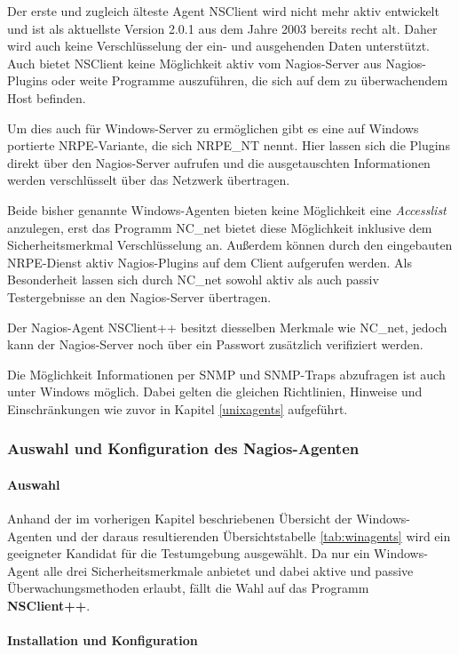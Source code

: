 Der erste und zugleich älteste Agent NSClient wird nicht mehr aktiv entwickelt und ist als aktuellste Version 2.0.1 aus dem Jahre 2003 bereits recht alt.
Daher wird auch keine Verschlüsselung der ein- und ausgehenden Daten unterstützt.
Auch bietet NSClient keine Möglichkeit aktiv vom Nagios-Server aus Nagios-Plugins oder weite Programme auszuführen, die sich auf dem zu überwachendem Host befinden.

Um dies auch für Windows-Server zu ermöglichen gibt es eine auf Windows portierte \gls{NRPE}-Variante, die sich NRPE\_NT nennt.
Hier lassen sich die Plugins direkt über den Nagios-Server aufrufen und die ausgetauschten Informationen werden verschlüsselt über das Netzwerk übertragen.

Beide bisher genannte Windows-Agenten bieten keine Möglichkeit eine \textit{Accesslist} anzulegen, erst das Programm NC\_net bietet diese Möglichkeit inklusive dem Sicherheitsmerkmal Verschlüsselung an.
Außerdem können durch den eingebauten \gls{NRPE}-Dienst aktiv Nagios-Plugins auf dem Client aufgerufen werden.
Als Besonderheit lassen sich durch NC\_net sowohl aktiv als auch passiv Testergebnisse an den Nagios-Server übertragen. 

Der Nagios-Agent NSClient++ besitzt diesselben Merkmale wie NC\_net, jedoch kann der Nagios-Server noch über ein Passwort zusätzlich verifiziert werden.

Die Möglichkeit Informationen per \gls{SNMP} und \gls{SNMP}-Traps abzufragen ist auch unter Windows möglich.
Dabei gelten die gleichen Richtlinien, Hinweise und Einschränkungen wie zuvor in Kapitel \ref{unixagents} aufgeführt.

\subsubsection{Auswahl und Konfiguration des Nagios-Agenten}

\paragraph{Auswahl}
Anhand der im vorherigen Kapitel beschriebenen Übersicht der Windows-Agenten und der daraus resultierenden Übersichtstabelle \ref{tab:winagents} wird ein geeigneter Kandidat für die Testumgebung ausgewählt.
Da nur ein Windows-Agent alle drei Sicherheitsmerkmale anbietet und dabei aktive und passive Überwachungsmethoden erlaubt, fällt die Wahl auf das Programm \textbf{NSClient++}.

\paragraph{Installation und Konfiguration}

